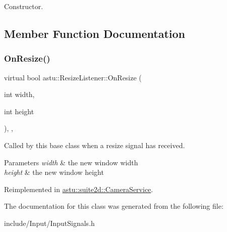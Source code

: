 Constructor. 

\subsection{Member Function Documentation}
\mbox{\label{classastu_1_1ResizeListener_a34f14538388fdd36713cd1097dcf5fb1}} 
\subsubsection{\texorpdfstring{On\+Resize()}{OnResize()}}
{\footnotesize\ttfamily virtual bool astu\+::\+Resize\+Listener\+::\+On\+Resize (\begin{DoxyParamCaption}\item[{int}]{width,  }\item[{int}]{height }\end{DoxyParamCaption})\hspace{0.3cm}{\ttfamily [inline]}, {\ttfamily [protected]}, {\ttfamily [virtual]}}

Called by this base class when a resize signal has received.


\begin{DoxyParams}{Parameters}
{\em width} & the new window width \\
\hline
{\em height} & the new window height \\
\hline
\end{DoxyParams}


Reimplemented in \hyperlink{classastu_1_1suite2d_1_1CameraService_a4229a725df31a9e416240f4b32040cdd}{astu\+::suite2d\+::\+Camera\+Service}.



The documentation for this class was generated from the following file\+:\begin{DoxyCompactItemize}
\item 
include/\+Input/Input\+Signals.\+h\end{DoxyCompactItemize}
